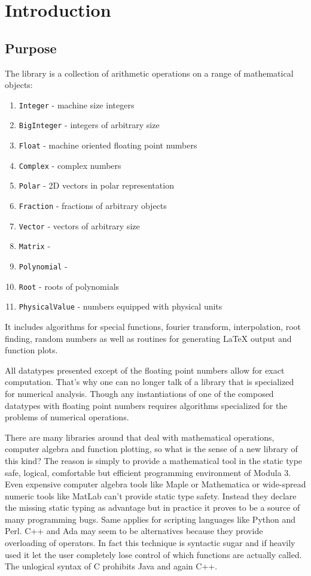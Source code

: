 \section{Introduction}

\subsection{Purpose}

\newcommand\nadt[2]{\item \texttt{#1} - #2}

The \modna{} library is a collection of arithmetic operations
on a range of mathematical objects:
\begin{enumerate}
\nadt{Integer}{machine size integers}
\nadt{BigInteger}{integers of arbitrary size}
\nadt{Float}{machine oriented floating point numbers}
\nadt{Complex}{complex numbers}
\nadt{Polar}{2D vectors in polar representation}
\nadt{Fraction}{fractions of arbitrary objects}
\nadt{Vector}{vectors of arbitrary size}
\nadt{Matrix}{}
\nadt{Polynomial}{}
\nadt{Root}{roots of polynomials}
\nadt{PhysicalValue}{numbers equipped with physical units}
\end{enumerate}
It includes algorithms for
special functions,
fourier transform,
interpolation,
root finding,
random numbers
as well as routines for generating \LaTeX{} output and
function plots.

All datatypes presented except of the floating point numbers
allow for exact computation.
That's why one can no longer talk of a library
that is specialized for numerical analysis.
Though any instantiations of one
of the composed datatypes with floating point numbers
requires algorithms specialized for the problems
of numerical operations.

There are many libraries around
that deal with mathematical operations,
computer algebra and function plotting,
so what is the sense of a new library of this kind?
The reason is simply to provide
a mathematical tool in the static type safe, logical, comfortable
but efficient programming environment of Modula 3.
Even expensive computer algebra tools like Maple or Mathematica
or wide-spread numeric tools like MatLab
can't provide static type safety.
Instead they declare the missing static typing as advantage
but in practice it proves to be a source of many programming bugs.
Same applies for scripting languages like Python and Perl.
C++ and Ada may seem to be alternatives because they provide
overloading of operators.
In fact this technique is syntactic sugar
and if heavily used it let the user completely lose control
of which functions are actually called.
The unlogical syntax of C prohibits Java and again C++.

